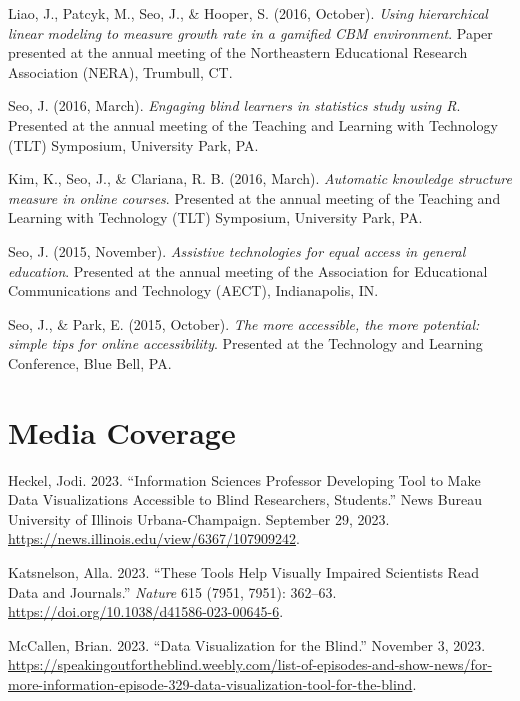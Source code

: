 \documentclass[11pt,a4paper,]{awesome-cv}
\newlength{\cslhangindent}
\newenvironment{CSLReferences}[2] %
 {\begin{list}{}{%
  \setlength{\itemindent}{0pt}
  \setlength{\leftmargin}{0pt}
  \setlength{\parsep}{0pt}
  \ifodd #1
   \setlength{\leftmargin}{\cslhangindent}
   \setlength{\itemindent}{-1\cslhangindent}
  \fi
  \setlength{\itemsep}{#2\baselineskip}}}
 {\end{list}}
\begin{document}
Liao, J., Patcyk, M., Seo, J., \& Hooper, S. (2016, October).
\emph{Using hierarchical linear modeling to measure growth rate in a
gamified CBM environment}. Paper presented at the annual meeting of the
Northeastern Educational Research Association (NERA), Trumbull, CT.

Seo, J. (2016, March). \emph{Engaging blind learners in statistics study
using R}. Presented at the annual meeting of the Teaching and Learning
with Technology (TLT) Symposium, University Park, PA.

Kim, K., Seo, J., \& Clariana, R. B. (2016, March). \emph{Automatic
knowledge structure measure in online courses}. Presented at the annual
meeting of the Teaching and Learning with Technology (TLT) Symposium,
University Park, PA.

Seo, J. (2015, November). \emph{Assistive technologies for equal access
in general education}. Presented at the annual meeting of the
Association for Educational Communications and Technology (AECT),
Indianapolis, IN.

Seo, J., \& Park, E. (2015, October). \emph{The more accessible, the
more potential: simple tips for online accessibility}. Presented at the
Technology and Learning Conference, Blue Bell, PA.

\section{Media Coverage}\label{media-coverage}

\label{refs-232f4b001e79d047eaeb05f5ea63b847}
\begin{CSLReferences}{1}{0}
Heckel, Jodi. 2023. {``Information Sciences Professor Developing Tool to
Make Data Visualizations Accessible to Blind Researchers, Students.''}
News Bureau University of Illinois Urbana-Champaign. September 29, 2023.
\url{https://news.illinois.edu/view/6367/107909242}.

Katsnelson, Alla. 2023. {``These Tools Help Visually Impaired Scientists
Read Data and Journals.''} \emph{Nature} 615 (7951, 7951): 362--63.
\url{https://doi.org/10.1038/d41586-023-00645-6}.

McCallen, Brian. 2023. {``Data Visualization for the Blind.''} November
3, 2023.
\url{https://speakingoutfortheblind.weebly.com/list-of-episodes-and-show-news/for-more-information-episode-329-data-visualization-tool-for-the-blind}.

\end{CSLReferences}
\end{document}
